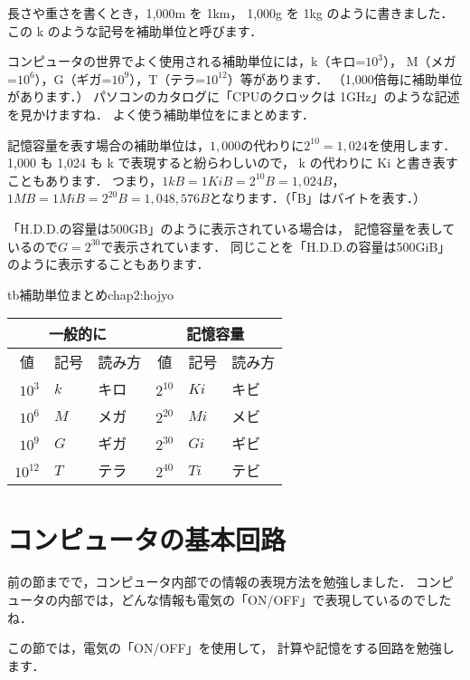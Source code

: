 長さや重さを書くとき，1,000m を 1km， 1,000g を 1kg のように書きました．
この k のような記号を補助単位と呼びます．

コンピュータの世界でよく使用される補助単位には，k（キロ=$10^3$），
M（メガ=$10^6$），G（ギガ=$10^9$），T（テラ=$10^{12}$）等があります．
（1,000倍毎に補助単位があります．）
パソコンのカタログに「CPUのクロックは 1GHz」のような記述を見かけますね．
よく使う補助単位をにまとめます．

記憶容量を表す場合の補助単位は，$1,000$の代わりに$2^{10} = 1,024$を使用します．
1,000 も 1,024 も k で表現すると紛らわしいので，
k の代わりに Ki と書き表すこともあります．
つまり，$1kB =1KiB = 2^{10}B = 1,024B$，
$1MB =1MiB = 2^{20}B = 1,048,576B$となります．（「B」はバイトを表す．）

「H.D.D.の容量は500GB」のように表示されている場合は，
記憶容量を表しているので$G = 2^{30}$で表示されています．
同じことを「H.D.D.の容量は500GiB」のように表示することもあります．

\begin{mytable}{tb}{補助単位まとめ}{chap2:hojyo}
{\small\begin{tabular}{r l l | r l l}\hline\hline
\multicolumn{3}{c|}{一般的に} &
\multicolumn{3}{c}{記憶容量} \\
\hline
\multicolumn{1}{c}{値} &
\multicolumn{1}{c}{記号} &
\multicolumn{1}{c|}{読み方} &
\multicolumn{1}{c}{値} &
\multicolumn{1}{c}{記号} &
\multicolumn{1}{c}{読み方} \\
\hline
$10^3$   & $k$ & キロ   & $2^{10}$ & $Ki$ & キビ \\
$10^6$   & $M$ & メガ   & $2^{20}$ & $Mi$ & メビ \\
$10^9$   & $G$ & ギガ   & $2^{30}$ & $Gi$ & ギビ \\
$10^{12}$& $T$ & テラ   & $2^{40}$ & $Ti$ & テビ \\
\end{tabular}}
\end{mytable}

\section{コンピュータの基本回路}

前の節までで，コンピュータ内部での情報の表現方法を勉強しました．
コンピュータの内部では，どんな情報も電気の「ON/OFF」で表現しているのでしたね．

この節では，電気の「ON/OFF」を使用して，
計算や記憶をする回路を勉強します．

